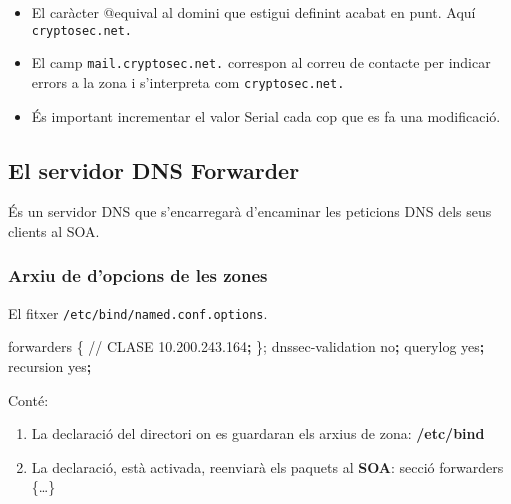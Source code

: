 \documentclass[]{article}
\newenvironment{Shaded}{}{}
\newcommand{\ExtensionTok}[1]{#1}
\newcommand{\KeywordTok}[1]{\textcolor[rgb]{0.00,0.44,0.13}{\textbf{#1}}}
\newcommand{\NormalTok}[1]{#1}
\begin{document}
\begin{itemize}
\item
  El caràcter @equival al domini que estigui definint acabat en punt.
  Aquí \texttt{cryptosec.net.}
\item
  El camp \texttt{mail.cryptosec.net.} correspon al correu de contacte
  per indicar errors a la zona i s'interpreta com
  \texttt{cryptosec.net.}
\item
  És important incrementar el valor Serial cada cop que es fa una
  modificació.
\end{itemize}

\hypertarget{el-servidor-dns-forwarder}{%
\subsection{\texorpdfstring{\textbf{El servidor DNS
Forwarder}}{El servidor DNS Forwarder}}\label{el-servidor-dns-forwarder}}

És un servidor DNS que s'encarregarà d'encaminar les peticions DNS dels
seus clients al SOA.

\hypertarget{arxiu-de-dopcions-de-les-zones-1}{%
\subsubsection{\texorpdfstring{\textbf{Arxiu de d'opcions de les
zones}}{Arxiu de d'opcions de les zones}}\label{arxiu-de-dopcions-de-les-zones-1}}

El fitxer \texttt{/etc/bind/named.conf.options}.

\begin{Shaded}
\begin{Highlighting}[]
        \ExtensionTok{forwarders}\NormalTok{ \{}
        \ExtensionTok{//}\NormalTok{ CLASE}
                \ExtensionTok{10.200.243.164}\KeywordTok{;}
\NormalTok{        \};}
        \ExtensionTok{dnssec-validation}\NormalTok{ no}\KeywordTok{;}
        \ExtensionTok{querylog}\NormalTok{ yes}\KeywordTok{;}
        \ExtensionTok{recursion}\NormalTok{ yes}\KeywordTok{;}
\end{Highlighting}
\end{Shaded}

Conté:

\begin{enumerate}
\def\labelenumi{\arabic{enumi}.}
\item
  La declaració del directori on es guardaran els arxius de zona:
  \textbf{/etc/bind}
\item
  La declaració, està activada, reenviarà els paquets al \textbf{SOA}:
  secció forwarders \{\ldots{}\}
\end{enumerate}
\end{document}
